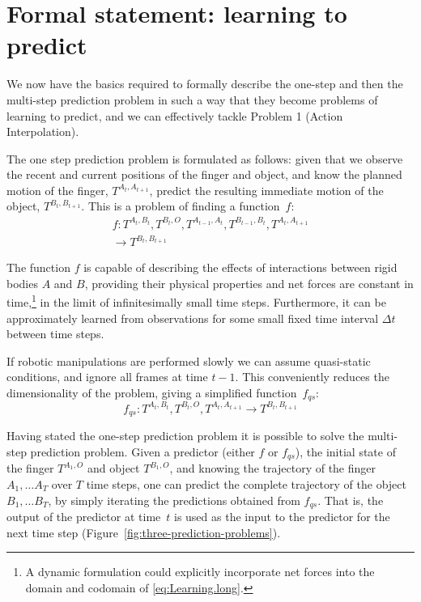 \section{Formal statement: learning to predict}
\label{sec:PredictionProblem}

We now have the basics required to formally describe the one-step and then the multi-step prediction
problem in such a way that they become problems of learning to predict, and we can effectively tackle Problem 1 (Action Interpolation).

 The one step prediction problem is formulated as follows: given that we observe the recent and current positions of the finger and object, and know the planned motion of the finger, $T^{A_{t},  A_{t+1}}$, predict the resulting immediate motion of the object,
$T^{B_{t}, B_{t+1}}$.  This is a problem of finding a function~$f$:
\begin{multline}
f: T^{A_t, B_t}, T^{B_t, O}, T^{A_{t-1}, A_{t}}, T^{B_{t-1}, B_{t}}, T^{A_{t}, A_{t+1}} \\ \longrightarrow T^{B_{t}, B_{t+1}}
\label{eq:Learning.long}
\end{multline}

The function $f$ is capable of describing the effects of interactions between rigid bodies $A$ and $B$, providing their physical properties and net forces are constant
in time,\footnote{A dynamic formulation could explicitly incorporate
net forces into the domain and codomain of \eqref{eq:Learning.long}.}
in the limit of infinitesimally small time steps.
Furthermore, it can be approximately learned from observations
for some small fixed time interval $\Delta t$ between time steps.

If robotic manipulations are performed slowly we can assume quasi-static conditions, and ignore all frames at time $t-1$.  This conveniently reduces the dimensionality of the problem, giving a simplified function~$f_{qs}$:
\begin{equation}
f_{qs}: T^{A_t, B_t}, T^{B_t, O}, T^{A_{t}, A_{t+1}} \longrightarrow T^{B_{t}, B_{t+1}}
\label{eq:Learning.short}
\end{equation}

 Having stated the one-step prediction problem it is possible to solve
the multi-step prediction problem. Given a predictor (either $f$ or
$f_{qs}$), the initial state of the finger $T^{A_{1}, O}$ and object
$T^{B_{1}, O}$, and knowing the trajectory of the finger $A_{1},
\ldots A_{T}$ over $T$ time steps, one can predict the complete
trajectory of the object $B_{1}, \ldots B_{T}$, by simply iterating
the predictions obtained from $f_{qs}$.  That is, the output of the
predictor at time~$t$ is used as the input to the predictor for the
next time step (Figure~\ref{fig:three-prediction-problems}).

